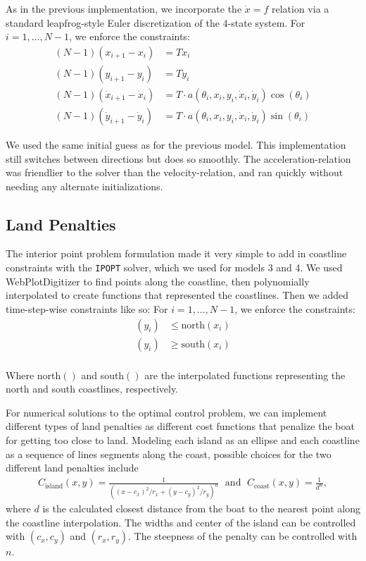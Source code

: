 \documentclass[11pt]{amsart}
\begin{document}
\par As in the previous implementation, we incorporate the $\dot{x} = f$ relation via a standard leapfrog-style Euler discretization of the 4-state system. For $i = 1, \ldots, N-1$, we enforce the constraints:
\begin{align*}
(N-1)(x_{i+1} - x_i) &= T \dot{x}_i \\
(N-1)(y_{i+1} - y_i) &= T \dot{y}_i \\
(N-1)(\dot{x}_{i+1} - \dot{x}_i) &= T \cdot a(\theta_i, x_i, y_i, \dot{x}_i, \dot{y}_i) \cos(\theta_i) \\
(N-1)(\dot{y}_{i+1} - \dot{y}_i) &= T \cdot a(\theta_i, x_i, y_i, \dot{x}_i, \dot{y}_i) \sin(\theta_i)
\end{align*}

\par We used the same initial guess as for the previous model. This implementation still switches between directions but does so smoothly. The acceleration-relation was friendlier to the solver than the velocity-relation, and ran quickly without needing any alternate initializations.

\subsection{Land Penalties}
\par The interior point problem formulation made it very simple to add in coastline constraints with the \texttt{IPOPT} solver, which we used for models 3 and 4. We used WebPlotDigitizer to find points along the coastline, then polynomially interpolated to create functions that represented the coastlines. Then we added time-step-wise constraints like so:
For $i = 1, \ldots, N-1$, we enforce the constraints:
\begin{align*}
(y_{i}) &\leq \text{north}({x}_i) \\
(y_{i}) &\geq \text{south}({x}_i) \\
\end{align*}

\par Where north$()$ and south$()$ are the interpolated functions representing the north and south coastlines, respectively.

\par For numerical solutions to the optimal control problem, we can implement different types of land penalties as different cost functions that penalize the boat for getting too close to land. Modeling each island as an ellipse and each coastline as a sequence of lines segments along the coast, possible choices for the two different land penalties include
\begin{align*}
    C_{\text{island}}(x,y) = \frac{1}{\left((x-c_x)^2/r_x + (y-c_y)^2/r_y\right)^n} \; \text{ and } \; C_{\text{coast}}(x,y) = \frac{1}{d^n},
\end{align*}
where $d$ is the calculated closest distance from the boat to the nearest point along the coastline interpolation. The widths and center of the island can be controlled with $(c_x, c_y)$ and $(r_x, r_y)$. The steepness of the penalty can be controlled with $n$. 
\end{document}
